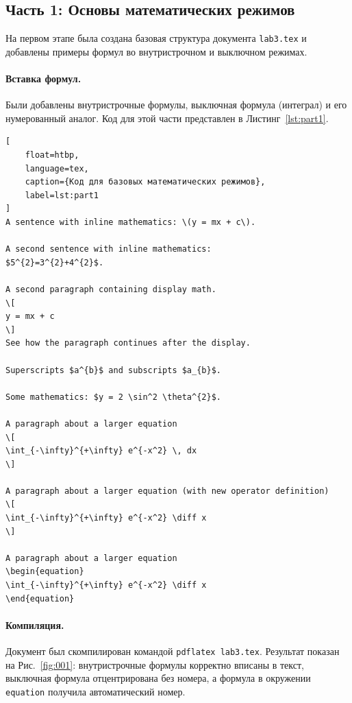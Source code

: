 \documentclass[a4paper, 12pt]{article}
\renewcommand{\figurename}{Рис.}
\renewcommand{\lstlistingname}{Листинг}
\begin{document}
\subsection{Часть 1: Основы математических режимов}
На первом этапе была создана базовая структура документа \texttt{lab3.tex} и добавлены примеры формул во внутристрочном и выключном режимах.

\paragraph{Вставка формул.}
Были добавлены внутристрочные формулы, выключная формула (интеграл) и его нумерованный аналог. Код для этой части представлен в \lstlistingname~\ref{lst:part1}.

\begin{lstlisting}[
    float=htbp,
    language=tex,
    caption={Код для базовых математических режимов},
    label=lst:part1
]
A sentence with inline mathematics: \(y = mx + c\).

A second sentence with inline mathematics:
$5^{2}=3^{2}+4^{2}$.

A second paragraph containing display math.
\[
y = mx + c
\]
See how the paragraph continues after the display.

Superscripts $a^{b}$ and subscripts $a_{b}$.

Some mathematics: $y = 2 \sin^2 \theta^{2}$.

A paragraph about a larger equation
\[
\int_{-\infty}^{+\infty} e^{-x^2} \, dx
\]

A paragraph about a larger equation (with new operator definition)
\[
\int_{-\infty}^{+\infty} e^{-x^2} \diff x
\]

A paragraph about a larger equation
\begin{equation}
\int_{-\infty}^{+\infty} e^{-x^2} \diff x
\end{equation}
\end{lstlisting}

\paragraph{Компиляция.}
Документ был скомпилирован командой \texttt{pdflatex lab3.tex}. Результат показан на \figurename~\ref{fig:001}: внутристрочные формулы корректно вписаны в текст, выключная формула отцентрирована без номера, а формула в окружении \texttt{equation} получила автоматический номер.
\end{document}
